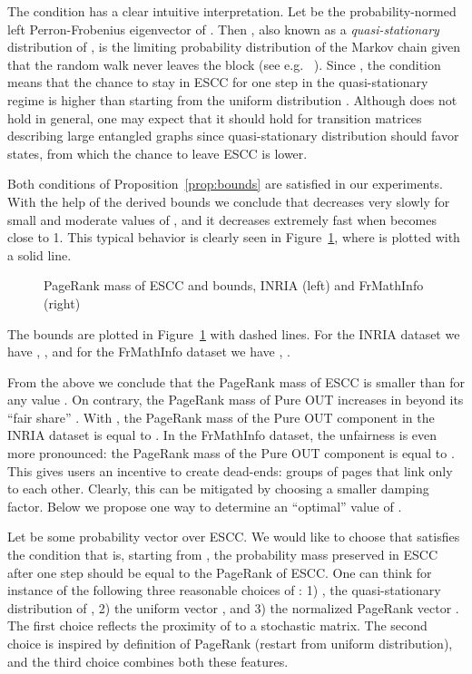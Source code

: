 \documentclass{article}
\begin{document}
The condition 
 has a clear intuitive interpretation. Let  be the probability-normed
left Perron-Frobenius eigenvector of . Then ,
also known as a {\it quasi-stationary} distribution of , is the
limiting probability distribution of the Markov chain given that
the random walk never leaves the block  (see e.g.
~\cite{Seneta}). Since , the
condition  means that the chance to stay in ESCC
for one step in the quasi-stationary regime is higher than
starting from the uniform distribution . Although
 does not hold in general, one may expect that it
should hold for transition matrices describing large entangled
graphs since quasi-stationary distribution should favor states,
from which the chance to leave ESCC is lower.


Both conditions of Proposition~\ref{prop:bounds} are satisfied in
our experiments. With the help of the derived bounds we conclude
that   decreases very slowly for small and
moderate values of , and it decreases extremely fast when 
becomes close to 1. This typical behavior is clearly seen in
Figure~\ref{fig:escc}, where  is plotted with a
solid line.
\begin{figure}[hbt]
{\epsfxsize=2in }
                \caption{\small PageRank mass of ESCC and bounds, INRIA (left) and FrMathInfo (right)}
\label{fig:escc}
\end{figure}
The bounds are plotted in Figure~\ref{fig:escc} with dashed lines.
For the INRIA dataset we have , ,
and for the FrMathInfo dataset we have ,
.


From the above we conclude that the PageRank mass of  ESCC is
smaller than  for any value . On contrary, the PageRank
mass of Pure OUT increases in  beyond its ``fair share''
. With , the PageRank mass of the Pure
OUT component in the INRIA dataset is equal to . In the
FrMathInfo dataset, the unfairness is even more pronounced: the
PageRank mass of the Pure OUT component is equal to .
This gives users an incentive to create dead-ends: groups of pages
that link only to each other. Clearly, this can be mitigated by
choosing a smaller damping factor. Below we propose one way to
determine an ``optimal'' value of .

Let  be some probability vector over ESCC. We would like to
choose  that satisfies the condition
 that is,
starting from , the probability mass preserved in ESCC after one
step should be equal to the PageRank of ESCC. One can think for
instance of the following three reasonable choices of : 1)
, the quasi-stationary distribution  of , 2) the
uniform vector , and 3) the normalized PageRank vector
. The first choice reflects the
proximity of   to a stochastic matrix. The second choice is
inspired by definition of PageRank (restart from uniform
distribution), and the third choice combines both these features.
\end{document}
